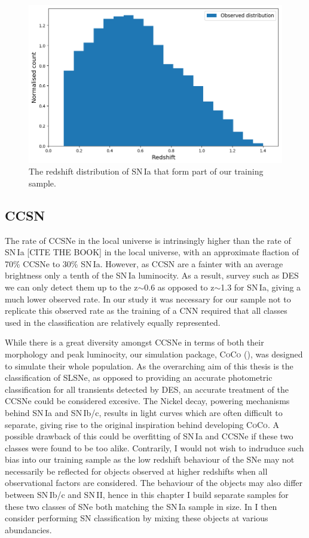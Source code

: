 \begin{figure}
  \includegraphics[width=\textwidth]{Figures/Chapter5/SNIa_z_dist.png}
  \caption{The redshift distribution of SN\,Ia that form part of our training sample. }
  \label{fig:IaDist}
\end{figure}

\subsection{CCSN}
The rate of CCSNe in the local universe is intrinsingly higher than the rate of SN\,Ia [CITE THE BOOK] in the local universe, with an approximate flaction of 70\% CCSNe to 30\% SN\,Ia. However, as CCSN are a fainter with an average brightness only a tenth of the SN\,Ia luminocity. As a result, survey such as DES we can only detect them up to the z$\sim$0.6 as opposed to z$\sim$1.3 for SN\,Ia, giving a much lower observed rate. In our study it was necessary for our sample not to replicate this observed rate as the training of a CNN required that all classes used in the classification are relatively equally represented.

While there is a great diversity amongst CCSNe in terms of both their morphology and peak luminocity, our simulation package, \textsc{CoCo} (), was designed to simulate their whole population. As the overarching aim of this thesis is the classification of SLSNe, as opposed to providing an accurate photometric classification for all transients detected by DES, an accurate treatment of the CCSNe could be considered excesive. The Nickel decay, powering mechanisms behind SN\,Ia and SN\,Ib/c, results in light curves which are often difficult to separate, giving rise to the original inspiration behind developing \textsc{CoCo}. A possible drawback of this could be overfitting of SN\,Ia and CCSNe if these two classes were found to be too alike. Contrarily, I would not wish to indruduce such bias into our training sample as the low redshift behaviour of the SNe may not necessarily be reflected for objects observed at higher redshifts when all observational factors are considered. The behaviour of the objects may also differ between SN\,Ib/c and SN\,II, hence in this chapter I build separate samples for these two classes of SNe both matching the SN\,Ia sample in size. In  I then consider performing SN classification by mixing these objects at various abundancies.

